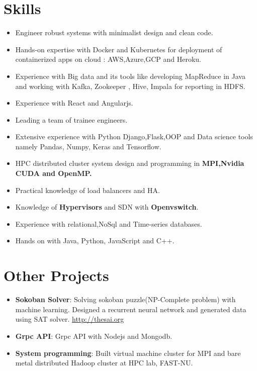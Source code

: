 \documentclass[letterpaper,11pt]{article}
\newcommand{\resumeItem}[2]{
  \item\small{
    \textbf{#1}{: #2 \vspace{-2pt}}
  }
}
\newcommand{\resumeSubItem}[2]{\resumeItem{#1}{#2}\vspace{-4pt}}
\newcommand{\resumeSubHeadingListStart}{\begin{itemize}[leftmargin=*]}
\newcommand{\resumeSubHeadingListEnd}{\end{itemize}}
\begin{document}
\section{Skills}
\resumeSubHeadingListStart
\item
{Engineer robust systems with minimalist design and clean code.}
\item
{Hands-on expertise with Docker and Kubernetes for deployment of containerized apps on cloud : AWS,Azure,GCP and Heroku.}
\item
{Experience with Big data and its tools like developing MapReduce in Java and working with Kafka, Zookeeper , Hive, Impala for reporting in HDFS.}
\item{
Experience with React and Angularjs}.
\item{Leading a team of trainee engineers.
}
\item{
Extensive experience with Python Django,Flask,OOP and Data science tools namely Pandas, Numpy, Keras and Tensorflow.
}
\item
{HPC distributed cluster system design and programming in \bf{MPI,Nvidia CUDA and OpenMP}.}
\item{
Practical knowledge of load balancers and HA.}
\item{
Knowledge of {\bf Hypervisors} and SDN with {\bf Openvswitch}.
}
\item{
Experience with relational,NoSql and Time-series databases.
}
\item {
	{Hands on with Java, Python, JavaScript and C++.}
}
\resumeSubHeadingListEnd



\section{Other Projects}
  \resumeSubHeadingListStart
      \resumeSubItem{Sokoban Solver}
  {Solving sokoban puzzle(NP-Complete problem) with machine learning. Designed a recurrent neural network and generated data using SAT solver. \href {http://thesai.org/Downloads/Volume8No3/Paper_64-Generation_of_Sokoban_Stages_using_Recurrent.pdf}{http://thesai.org}} 
	\resumeSubItem{Grpc API}
	{Grpc API with Nodejs and Mongodb.}

    \resumeSubItem{System programming}
      {Built virtual machine cluster for MPI and bare metal distributed Hadoop cluster at HPC lab, FAST-NU.}
  \resumeSubHeadingListEnd

%


\end{document}
